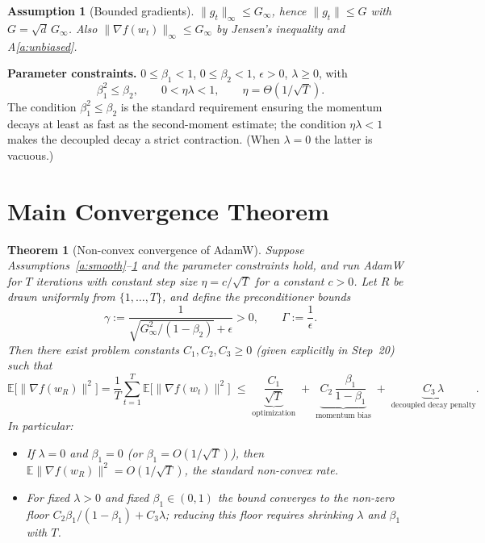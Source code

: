 \documentclass[11pt]{article}
\newtheorem{theorem}{Theorem}
\newtheorem{assumption}{Assumption}
\begin{document}
\begin{assumption}[Bounded gradients]\label{a:bg}
$\|g_t\|_\infty \le G_\infty$, hence $\|g_t\| \le G$ with $G=\sqrt{d}\,G_\infty$.
Also $\|\nabla f(w_t)\|_\infty\le G_\infty$ by Jensen's inequality and A\ref{a:unbiased}.
\end{assumption}

\noindent\textbf{Parameter constraints.}
$0\le\beta_1<1$, $0\le\beta_2<1$, $\epsilon>0$, $\lambda\ge 0$, with
\[
\beta_1^2 \le \beta_2,
\qquad
0 < \eta\lambda < 1 ,
\qquad
\eta=\Theta(1/\sqrt T).
\]
The condition $\beta_1^2\le\beta_2$ is the standard requirement ensuring the momentum
decays at least as fast as the second-moment estimate; the condition $\eta\lambda<1$
makes the decoupled decay a strict contraction. (When $\lambda=0$ the latter is vacuous.)

\section*{Main Convergence Theorem}
\begin{theorem}[Non-convex convergence of AdamW]\label{thm:main}
Suppose Assumptions~\ref{a:smooth}--\ref{a:bg} and the parameter constraints hold,
and run AdamW for $T$ iterations with constant step size $\eta = c/\sqrt{T}$ for a
constant $c>0$. Let $R$ be drawn uniformly from $\{1,\dots,T\}$, and define the
preconditioner bounds
\[
\gamma := \frac{1}{\sqrt{G_\infty^2/(1-\beta_2)}+\epsilon}>0,
\qquad
\Gamma := \frac{1}{\epsilon}.
\]
Then there exist problem constants $C_1,C_2,C_3\ge 0$ (given explicitly in Step~20)
such that
\[
\mathbb{E}\big[\|\nabla f(w_R)\|^2\big]
=\frac{1}{T}\sum_{t=1}^{T}\mathbb{E}\big[\|\nabla f(w_t)\|^2\big]
\;\le\;
\underbrace{\frac{C_1}{\sqrt T}}_{\text{optimization}}
\;+\;
\underbrace{C_2\,\frac{\beta_1}{1-\beta_1}}_{\text{momentum bias}}
\;+\;
\underbrace{C_3\,\lambda}_{\text{decoupled decay penalty}} .
\]
In particular:
\begin{itemize}
\item If $\lambda=0$ and $\beta_1=0$ (or $\beta_1=O(1/\sqrt T)$), then
$\mathbb{E}\|\nabla f(w_R)\|^2 = O(1/\sqrt T)$, the standard non-convex rate.
\item For fixed $\lambda>0$ and fixed $\beta_1\in(0,1)$ the bound converges to the
\emph{non-zero} floor $C_2\beta_1/(1-\beta_1)+C_3\lambda$; reducing this floor
requires shrinking $\lambda$ and $\beta_1$ with $T$.
\end{itemize}
\end{theorem}
\end{document}

